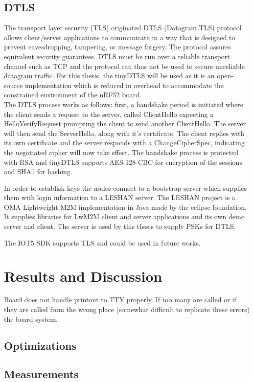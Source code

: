 \documentclass{article}
\begin{document}
\subsection{DTLS}
The transport layer security (TLS) originated DTLS (Datagram TLS) protocol allows client/server applications to communicate in a way that is designed to prevent eavesdropping, tampering, or message forgery. \cite{dtls} The protocol assures equivalent security guarantees. DTLS must be run over a reliable transport channel such as TCP and the protocol can thus not be used to secure unreliable datagram traffic.
For this thesis, the tinyDTLS will be used as it is an open-source implementation which is reduced in overhead to accommodate the constrained environment of the nRF52 board.\\
The DTLS process works as follows: first, a handshake period is initiated where the client sends a request to the server, called ClientHello expecting a HelloVerifyRequest prompting the client to send another ClientHello. The server will then send the ServerHello, along with it's certificate. The client replies with its own certificate and the server responds with a ChangeCipherSpec, indicating the negotiated cipher will now take effect.
The handshake process is protected with RSA and tinyDTLS supports AES-128-CBC for encryption of the sessions and SHA1 for hashing.

In order to establish keys the nodes connect to a bootstrap server which supplies them with login information to a LESHAN server. The LESHAN project is a OMA Lightweight M2M implementation in Java made by the eclipse foundation. \cite{leshan} It supplies libraries for LwM2M client and server applications and its own demo server and client. The server is used by this thesis to supply PSKs for DTLS.

The IOT5 SDK supports TLS and could be used in future works.
\section{Results and Discussion}

Board does not handle printout to TTY properly. If too many are called or if they are called from the wrong place (somewhat difficult to replicate these errors) the board system. 
\subsection{Optimizations}
\subsection{Measurements}
\end{document}
